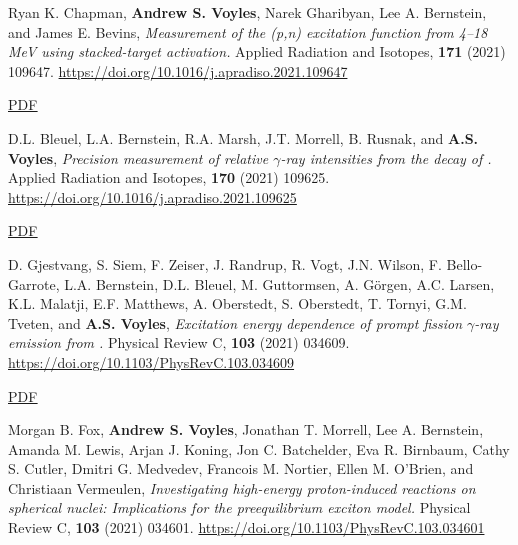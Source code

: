 \begin{bibsection}
\item Ryan K. Chapman, \textbf{Andrew S. Voyles}, Narek Gharibyan, Lee A. Bernstein, and
James E. Bevins, \emph{Measurement of the (p,n) excitation function from 4--18 MeV using stacked-target activation.} Applied Radiation and Isotopes, \textbf{171} (2021) 109647.  \url{https://doi.org/10.1016/j.apradiso.2021.109647} 

\ifshort \vspace{0.1cm} \href{https://avoyles.github.io/papers/Chapman2021_160Tb.pdf}{\underline{PDF}} \else  \fi 


\item D.L. Bleuel, L.A. Bernstein, R.A. Marsh, J.T. Morrell, B. Rusnak, and \textbf{A.S. Voyles},  \emph{Precision measurement of relative $\gamma$-ray intensities from the decay of .} Applied Radiation and Isotopes, \textbf{170} (2021) 109625. \url{https://doi.org/10.1016/j.apradiso.2021.109625} 

\ifshort \vspace{0.1cm} \href{https://avoyles.github.io/papers/Bleuel2021_61Cu.pdf}{\underline{PDF}} \else  \fi 

\item D. Gjestvang, S. Siem, F. Zeiser, J. Randrup, R. Vogt, J.N. Wilson, F. Bello-Garrote, L.A. Bernstein, D.L. Bleuel, M. Guttormsen, A. Görgen, A.C. Larsen, K.L. Malatji, E.F. Matthews, A. Oberstedt, S. Oberstedt, T. Tornyi, G.M. Tveten, and \textbf{A.S. Voyles}, \emph{Excitation energy dependence of prompt fission $\gamma$-ray emission from  .} Physical Review C, \textbf{103} (2021) 034609. \url{https://doi.org/10.1103/PhysRevC.103.034609}

\ifshort \vspace{0.1cm} \href{https://avoyles.github.io/papers/Gjestvang2021_241Pu.pdf}{\underline{PDF}} \else  \fi


\item Morgan B. Fox, \textbf{Andrew S. Voyles}, Jonathan T. Morrell, Lee A. Bernstein, Amanda M. Lewis, Arjan J. Koning, Jon C. Batchelder, Eva R. Birnbaum, Cathy S. Cutler, Dmitri G. Medvedev, Francois M. Nortier, Ellen M. O’Brien, and Christiaan Vermeulen, \emph{Investigating high-energy proton-induced reactions on spherical nuclei: Implications for the preequilibrium exciton model.} Physical Review C, \textbf{103} (2021) 034601. \url{https://doi.org/10.1103/PhysRevC.103.034601}


\end{bibsection}
